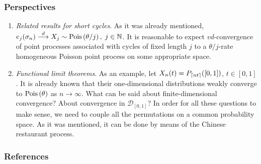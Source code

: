 \documentclass[12pt,pdf,aspectratio=169,t]{beamer}
\begin{document}
    \begin{frame}
        \frametitle{Perspectives}
        \begin{enumerate}
            \item \emph{Related results for short cycles}. As it was already mentioned,
            $\operatorname{c}_j(\sigma_n)\overset{d}{\longrightarrow} X_j \sim \mathrm{Pois}\left(\theta / j\right), \; j \in \mathbb{N}$.
            It is reasonable to expect $vd$-convergence of point processes associated with cycles of fixed length $j$
            to a $\theta / j$-rate homogeneous Poisson point process on some appropriate space.
            \item \emph{Functional limit theorems}. As an example, let $X_n(t) = P_{\lceil n t\rceil}([0, 1])$, $t \in [0, 1]$. 
            It is already known that their one-dimensional distributions weakly converge to
            $\mathrm{Pois}\left(\theta\right)$ as $n \to \infty$. What can be said
            about finite-dimensional convergence? About convergence in $\mathcal{D}_{[0, 1]}$?
            In order for all these questions to make sense, we need to couple 
            all the permutations on a common probability space. 
            As it was mentioned, it can be done by means of the Chinese restaurant process.
        \end{enumerate}
    \end{frame}
    \begin{frame}[allowframebreaks]
        \fontsize{10pt}{12pt}\selectfont
        \nocite{Ewens1972}
        \nocite{ATB1992}
        \nocite{Crane2016}
        \nocite{Kallenberg2017}
        \nocite{Resnick2008}
        \nocite{Holst1980}
        \nocite{Renyi1953}
        \nocite{LogStructures}
        \frametitle{References}
        
        
    \end{frame}
\end{document}
